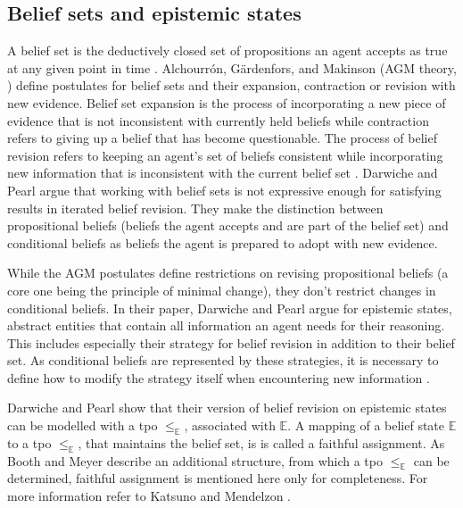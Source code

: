 \documentclass[english, 12pt]{scrartcl}
\theoremstyle{definition}
\theoremstyle{definition}
\theoremstyle{definition}
\begin{document}
\subsection{Belief sets and epistemic states}
\label{chapter:belief-sets-and-epistemic-states}
A belief set is the deductively closed set of propositions an agent accepts as true at any given point in time \cite{Ferme2011}. Alchourrón, Gärdenfors, and Makinson (AGM theory, \cite{Alchourron1985}) define postulates for belief sets and their expansion, contraction or revision with new evidence. Belief set expansion is the process of incorporating a new piece of evidence that is not inconsistent with currently held beliefs while contraction refers to giving up a belief that has become questionable. The process of belief revision refers to keeping an agent's set of beliefs consistent while incorporating new information that is inconsistent with the current belief set \cite{Katsuno1991, Gaerdenfors1984}. Darwiche and Pearl \cite{Darwiche1997} argue that working with belief sets is not expressive enough for satisfying results in iterated belief revision. They make the distinction between propositional beliefs (beliefs the agent accepts and are part of the belief set) and conditional beliefs as beliefs the agent is prepared to adopt with new evidence.

While the AGM postulates define restrictions on revising propositional beliefs (a core one being the principle of minimal change), they don't restrict changes in conditional beliefs. In their paper, Darwiche and Pearl argue for epistemic states, abstract entities that contain all information an agent needs for their reasoning. This includes especially their strategy for belief revision in addition to their belief set. As conditional beliefs are represented by these strategies, it is necessary to define how to modify the strategy itself when encountering new information \cite{Darwiche1997}.

Darwiche and Pearl show that their version of belief revision on epistemic states can be modelled with a tpo $\leq_{\mathbb{E}}$, associated with $\mathbb{E}$. A mapping of a belief state $\mathbb{E}$ to a tpo $\leq_{\mathbb{E}}$, that maintains the belief set, is is called a faithful assignment. As Booth and Meyer describe an additional structure, from which a tpo $\leq_{\mathbb{E}}$ can be determined, faithful assignment is mentioned here only for completeness. For more information refer to Katsuno and Mendelzon \cite{Katsuno1991}.
\end{document}
